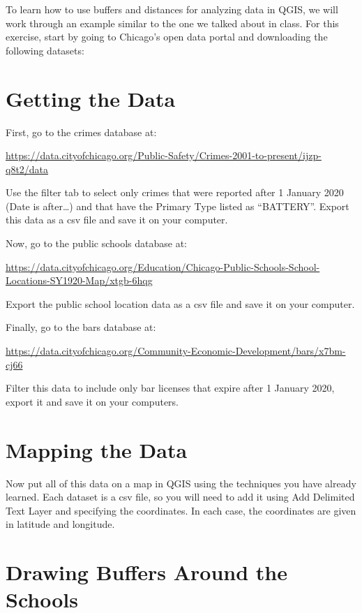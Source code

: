 \documentclass[]{book}
\begin{document}
To learn how to use buffers and distances for analyzing data in QGIS, we will work through an example similar to the one we talked about in class. For this exercise, start by going to Chicago's open data portal and downloading the following datasets:

\hypertarget{getting-the-data}{%
\section{Getting the Data}\label{getting-the-data}}

First, go to the crimes database at:

\url{https://data.cityofchicago.org/Public-Safety/Crimes-2001-to-present/ijzp-q8t2/data}

Use the filter tab to select only crimes that were reported after 1 January 2020 (Date is after\ldots{}) and that have the Primary Type listed as ``BATTERY''. Export this data as a csv file and save it on your computer.

Now, go to the public schools database at:

\url{https://data.cityofchicago.org/Education/Chicago-Public-Schools-School-Locations-SY1920-Map/xtgb-6hqg}

Export the public school location data as a csv file and save it on your computer.

Finally, go to the bars database at:

\url{https://data.cityofchicago.org/Community-Economic-Development/bars/x7bm-cj66}

Filter this data to include only bar licenses that expire after 1 January 2020, export it and save it on your computers.

\hypertarget{mapping-the-data}{%
\section{Mapping the Data}\label{mapping-the-data}}

Now put all of this data on a map in QGIS using the techniques you have already learned. Each dataset is a csv file, so you will need to add it using Add Delimited Text Layer and specifying the coordinates. In each case, the coordinates are given in latitude and longitude.

\hypertarget{drawing-buffers-around-the-schools}{%
\section{Drawing Buffers Around the Schools}\label{drawing-buffers-around-the-schools}}
\end{document}
